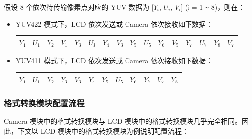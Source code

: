 \documentclass[main\_\_CN.tex]{subfiles}
\begin{document}
假设 8 个依次待传输像素点对应的 YUV 数据为 [$Y_i$, $U_i$, $V_i$] (i = 1 \verb+~+ 8)，则在：
\begin{itemize}
    \item YUV422 模式下，LCD 依次发送或 Camera 依次接收如下数据：
        \begin{table}[H]
            \centering
            \begin{tabular}{|c|c|c|c|c|c|c|c|c|c|c|c|c|c|c|c|}
            \hline
            $Y_1$ & $U_1$ & $Y_2$ & $V_1$ & $Y_3$ & $U_3$ & $Y_4$ & $V_3$ & $Y_5$ & $U_5$ & $Y_6$ & $V_5$ & $Y_7$ & $U_7$ & $Y_8$ & $V_7$ \\ \hline
            \end{tabular}
        \end{table}
    \item YUV411 模式下，LCD 依次发送或 Camera 依次接收如下数据：
        \begin{table}[H]
            \centering
            \begin{tabular}{|c|c|c|c|c|c|c|c|c|c|c|c|}
            \hline
            $Y_1$ & $U_1$ & $Y_2$ & $Y_3$ & $V_3$ & $Y_4$ & $Y_5$ & $U_5$ & $Y_6$ & $Y_7$ & $V_7$ & $Y_8$ \\ \hline
            \end{tabular}
        \end{table}
\end{itemize}

\subsubsection{格式转换模块配置流程}

Camera 模块中的格式转换模块与 LCD 模块中的格式转换模块几乎完全相同。因此，下文以 LCD 模块中的格式转换模块为例说明配置流程：
\end{document}
